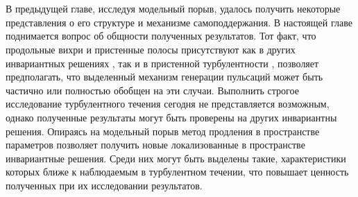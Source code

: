 
\chapter{}

В предыдущей главе, исследуя модельный порыв, удалось получить некоторые представления о его структуре и механизме самоподдержания. В настоящей главе поднимается вопрос об общности полученных результатов. Тот факт, что продольные вихри и пристенные полосы присутствуют как в других инвариантных решениях \cite{Kawahara2012}, так и в пристенной турбулентности \cite{Kline1967, Smith1983, Schoppa2002}, позволяет предполагать, что выделенный механизм генерации пульсаций может быть частично или полностью обобщен на эти случаи. Выполнить строгое исследование турбулентного течения сегодня не представляется возможным, однако полученные результаты могут быть проверены на других инвариантны решения. Опираясь на модельный порыв метод продления в пространстве параметров \cite{Sanchez2004, Viswanath2007, Dijkstra2014} позволяет получить новые локализованные в пространстве инвариантные решения. Среди них могут быть выделены такие, характеристики которых ближе к наблюдаемым в турбулентном течении, что повышает ценность полученных при их исследовании результатов. 

